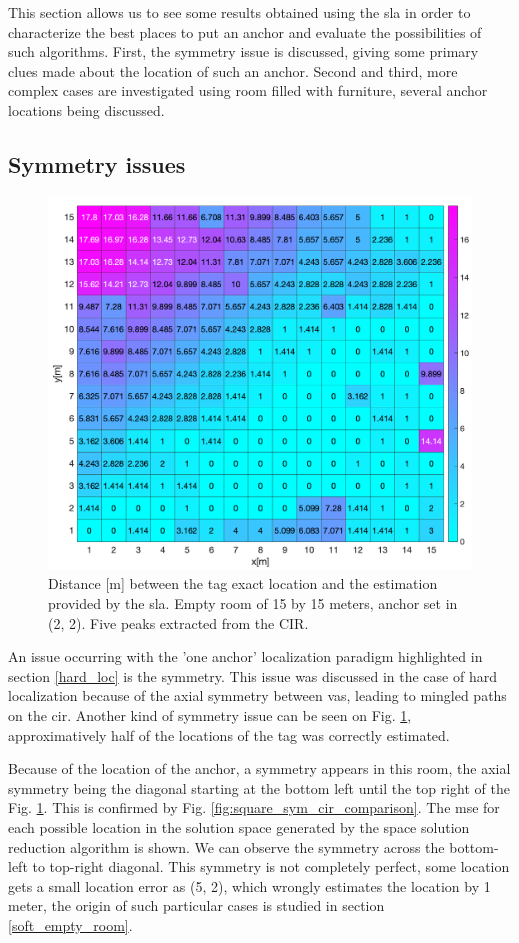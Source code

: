 This section allows us to see some results obtained using the \gls{sla} in order to characterize the best places to put an anchor and evaluate the possibilities of such algorithms. First, the symmetry issue is discussed, giving some primary clues made about the location of such an anchor. Second and third, more complex cases are investigated using room filled with furniture, several anchor locations being discussed.

\subsection{Symmetry issues}
\label{sym_cases}
\begin{figure}[H]
\centering
\includegraphics[width=.73\linewidth]{Images/15_15_sym.png}
\caption{Distance [m] between the tag exact location and the estimation provided by the \gls{sla}. Empty room of 15 by 15 meters, anchor set in (2, 2). Five peaks extracted from the CIR. \label{fig:square_sym}}
\end{figure}

An issue occurring with the 'one anchor' localization paradigm highlighted in section \ref{hard_loc} is the symmetry. This issue was discussed in the case of hard localization because of the axial symmetry between \glspl{va}, leading to mingled paths on the \gls{cir}. Another kind of symmetry issue can be seen on Fig. \ref{fig:square_sym}, approximatively half of the locations of the tag was correctly estimated.
\vspace{2mm}

Because of the location of the anchor, a symmetry appears in this room, the axial symmetry being the diagonal starting at the bottom left until the top right of the Fig. \ref{fig:square_sym}. This is confirmed by Fig. \ref{fig:square_sym_cir_comparison}. The \gls{mse} for each possible location in the solution space generated by the space solution reduction algorithm is shown. We can observe the symmetry across the bottom-left to top-right diagonal. This symmetry is not completely perfect, some location gets a small location error as (5, 2), which wrongly estimates the location by 1 meter, the origin of such particular cases is studied in section \ref{soft_empty_room}.

